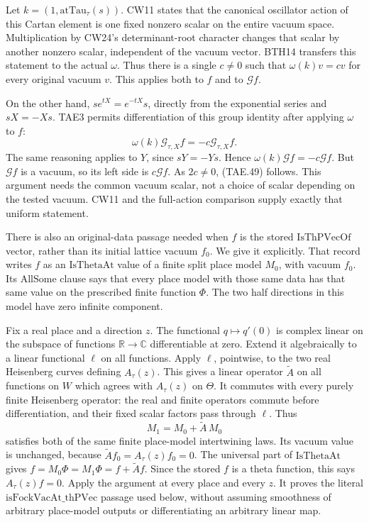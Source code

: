 Let \(k=(1,\mathrm{atTau}_\tau(s))\).
CW11 states that the canonical oscillator action of this
Cartan element is one fixed nonzero scalar on the entire
vacuum space.  Multiplication by CW24's determinant-root
character changes that scalar by another nonzero scalar,
independent of the vacuum vector.  BTH14 transfers this
statement to the actual \(\omega\).  Thus there is a single
\(c\ne0\) such that \(\omega(k)v=cv\) for every original
vacuum \(v\).  This applies both to \(f\) and to
\(\mathcal Gf\).

On the other hand,
\(s e^{tX}=e^{-tX}s\), directly from the exponential
series and \(sX=-Xs\).  TAE3 permits differentiation of
this group identity after applying \(\omega\) to \(f\):
\[
       \omega(k)\mathcal G_{\tau,X}f
                           =-c\mathcal G_{\tau,X}f .
 \tag{TAE.52}
\]
The same reasoning applies to \(Y\), since \(sY=-Ys\).
Hence \(\omega(k)\mathcal Gf=-c\mathcal Gf\).
But \(\mathcal Gf\) is a vacuum, so its left side is
\(c\mathcal Gf\).  As \(2c\ne0\), (TAE.49) follows.
This argument needs the common vacuum scalar, not a choice
of scalar depending on the tested vacuum.  CW11 and the
full-action comparison supply exactly that uniform statement.

There is also an original-data passage needed when \(f\)
is the stored \(\mathrm{IsThPVecOf}\) vector, rather than
its initial lattice vacuum \(f_0\).  We give it explicitly.
That record writes \(f\) as an \(\mathrm{IsThetaAt}\)
value of a finite split place model \(M_0\), with
vacuum \(f_0\).  Its \(\mathrm{AllSome}\) clause says that
every place model with those same data has that same
value on the prescribed finite function \(\Phi\).
The two half directions in this model have zero
infinite component.

Fix a real place and a direction \(z\).
The functional \(q\mapsto q'(0)\) is complex linear
on the subspace of functions \(\mathbb R\to\mathbb C\)
differentiable at zero.  Extend it algebraically
to a linear functional \(\ell\) on all functions.
Apply \(\ell\), pointwise, to the two real Heisenberg
curves defining \(A_\tau(z)\).  This gives a linear
operator \(\widetilde A\) on all functions on \(W\)
which agrees with \(A_\tau(z)\) on \(\Theta\).
It commutes with every purely finite Heisenberg
operator: the real and finite operators commute
before differentiation, and their fixed scalar
factors pass through \(\ell\).
Thus
\[
                  M_1=M_0+\widetilde A\,M_0
 \tag{TAE.52a}
\]
satisfies both of the same finite place-model
intertwining laws.  Its vacuum value is unchanged,
because \(\widetilde A f_0=A_\tau(z)f_0=0\).
The universal part of \(\mathrm{IsThetaAt}\) gives
\(f=M_0\Phi=M_1\Phi=f+\widetilde A f\).
Since the stored \(f\) is a theta function, this
says \(A_\tau(z)f=0\).
Apply the argument at every place and every \(z\).
It proves the literal
\(\mathrm{isFockVacAt\_thPVec}\) passage used below,
without assuming smoothness of arbitrary place-model
outputs or differentiating an arbitrary linear map.

